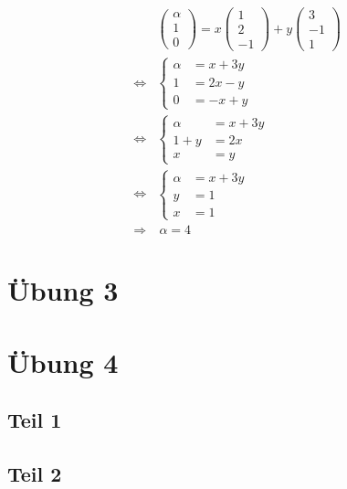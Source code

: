 \documentclass[a4paper,10pt]{article}
\begin{document}
\begin{align*}
 & \begin{pmatrix}
  \alpha\\
  1\\
  0
 \end{pmatrix} = x
 \begin{pmatrix}
  1\\
  2\\
  -1
 \end{pmatrix} + y
 \begin{pmatrix}
  3\\
  -1\\
  1
 \end{pmatrix}\\
 \Leftrightarrow &
  \begin{cases}
   \alpha & = x + 3y\\
   1 & = 2x - y\\
   0 & = -x + y
  \end{cases}\\
 \Leftrightarrow &
  \begin{cases}
   \alpha & = x + 3y\\
   1 + y& = 2x\\
   x & = y
  \end{cases}\\
 \Leftrightarrow &
  \begin{cases}
   \alpha & = x + 3y\\
   y& = 1\\
   x & = 1
  \end{cases}\\
 \Rightarrow &\ \alpha = 4
\end{align*}


\section*{Übung 3}

\section*{Übung 4}

\subsection*{Teil 1}

\subsection*{Teil 2}
\end{document}
